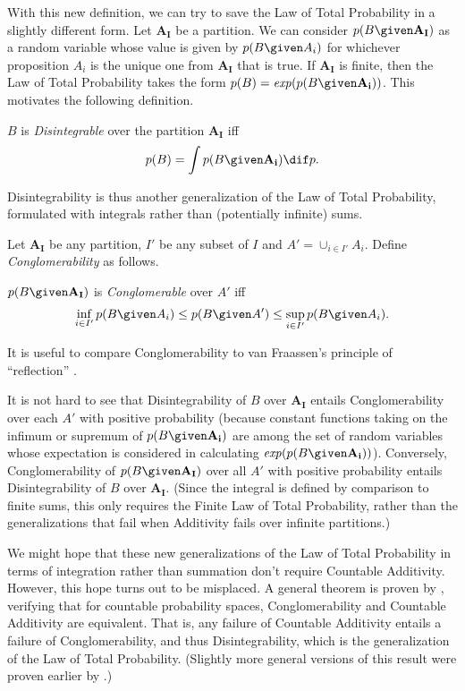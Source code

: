 With this new definition, we can try to save the Law of Total Probability in a slightly different form. Let $\mathbf{A_I}$ be a partition. We can consider $p(B \given \mathbf{A_I})$ as a random variable whose value is given by $p(B \given A_i)$ for whichever proposition $A_i$ is the unique one from $\mathbf{A_I}$ that is true. If $\mathbf{A_I}$ is finite, then the Law of Total Probability takes the form $p(B)=\text{\textit{exp}}(p(B \given \mathbf{A_i}))$. This motivates the following definition.
\begin{definition}\label{disintegrable}
$B$ is \emph{Disintegrable} over the partition $\mathbf{A_I}$ iff $$p(B)=\int p(B \given \mathbf{A_i}) \dif p.$$
\end{definition}
Disintegrability is thus another generalization of the Law of Total Probability, formulated with integrals rather than (potentially infinite) sums.

Let $\mathbf{A_I}$ be any partition, $I'$ be any subset of $I$ and $A'=\cup_{i\in I'}A_i$. Define \textit{Conglomerability} as follows.
\begin{definition}\label{conglomerable}
$p(B \given \mathbf{A_I})$ is \emph{Conglomerable} over $A'$ iff
$$\inf_{i\in I'} p(B \given A_i)\leq p(B \given A')\leq \sup_{i\in I'} p(B \given A_i).$$
\end{definition}
It is useful to compare Conglomerability to van Fraassen's principle of ``reflection'' \citep{belandwill, distrefl}.

It is not hard to see that Disintegrability of $B$ over $\mathbf{A_I}$ entails Conglomerability over each $A'$ with positive probability (because constant functions taking on the infimum or supremum of $p(B \given \mathbf{A_i})$ are among the set of random variables whose expectation is considered in calculating $\text{\textit{exp}}(p(B \given \mathbf{A_i}))$). Conversely, Conglomerability of $p(B \given \mathbf{A_I})$ over all $A'$ with positive probability entails Disintegrability of $B$ over $\mathbf{A_I}$. (Since the integral is defined by comparison to finite sums, this only requires the Finite Law of Total Probability, rather than the generalizations that fail when Additivity fails over infinite partitions.) 

We might hope that these new generalizations of the Law of Total Probability in terms of integration rather than summation don't require Countable Additivity. However, this hope turns out to be misplaced. A general theorem is proven by \citet{conglom}, verifying that for countable probability spaces, Conglomerability and Countable Additivity are equivalent. That is, any failure of Countable Additivity entails a failure of Conglomerability, and thus Disintegrability, which is the generalization of the Law of Total Probability. (Slightly more general versions of this result were proven earlier by \citealp{nonconglom}.)

